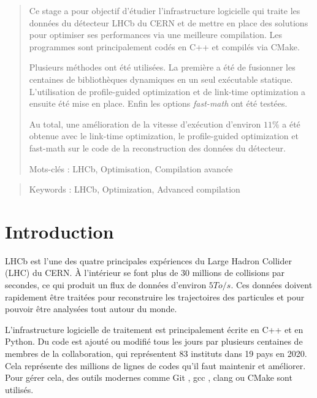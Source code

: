 \documentclass[a4paper,11pt]{report}
\begin{document}
\begin{abstract}

    Ce stage a pour objectif d'étudier l'infrastructure logicielle qui traite les données du détecteur LHCb du CERN et de mettre en place des solutions pour optimiser ses performances via une meilleure compilation.
    Les programmes sont principalement codés en C++ et compilés via CMake.

    Plusieurs méthodes ont été utilisées.
    La première a été de fusionner les centaines de bibliothèques dynamiques en un seul exécutable statique.
    L'utilisation de profile-guided optimization et de link-time optimization a ensuite été mise en place.
    Enfin les options \emph{fast-math} ont été testées.

    Au total, une amélioration de la vitesse d'exécution d'environ $11\%$ a été obtenue avec le link-time optimization, le profile-guided optimization et fast-math sur le code de la reconstruction des données du détecteur.

    \vfill

    Mots-clés : LHCb, Optimisation, Compilation avancée

\end{abstract}

\begin{otherlanguage}{english}
    \begin{abstract}

        \vfill

        Keywords : LHCb, Optimization, Advanced compilation
    \end{abstract}
\end{otherlanguage}


\chapter*{Introduction}
LHCb est l'une des quatre principales expériences du Large Hadron Collider (LHC) du CERN.
À l'intérieur se font plus de 30 millions de collisions par secondes, ce qui produit un flux de données d'environ $5 To/s$.
Ces données doivent rapidement être traitées pour reconstruire les trajectoires des particules et pour pouvoir être analysées tout autour du monde.

L'infrastructure logicielle de traitement est principalement écrite en C++ et en Python.
Du code est ajouté ou modifié tous les jours par plusieurs centaines de membres de la collaboration, qui représentent 83 instituts dans 19 pays en 2020.
Cela représente des millions de lignes de codes qu'il faut maintenir et améliorer.
Pour gérer cela, des outils modernes comme Git \cite{git}, gcc \cite{gcc}, clang ou CMake \cite{cmake} sont utilisés.
\end{document}
